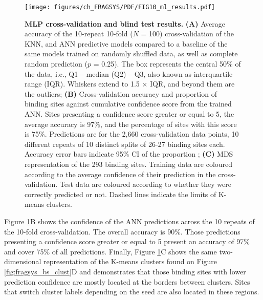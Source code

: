 \begin{figure}[htbp]
    \centering
    \texttt{[image: figures/ch\_FRAGSYS/PDF/FIG10\_ml\_results.pdf]}
    \caption[MLP cross-validation and blind test results]{\textbf{MLP cross-validation and blind test results.} \textbf{(A)} Average accuracy of the 10-repeat 10-fold ($N$ = 100) cross-validation of the KNN, and ANN predictive models compared to a baseline of the same models trained on randomly shuffled data, as well as complete random prediction ($p$ = 0.25). The box represents the central 50\% of the data, i.e., Q1 – median (Q2) – Q3, also known as interquartile range (IQR). Whiskers extend to 1.5 $\times$ IQR, and beyond them are the outliers; \textbf{(B)} Cross-validation accuracy and proportion of binding sites against cumulative confidence score from the trained ANN. Sites presenting a confidence score greater or equal to 5, the average accuracy is 97\%, and the percentage of sites with this score is 75\%. Predictions are for the 2,660 cross-validation data points, 10 different repeats of 10 distinct splits of 26-27 binding sites each. Accuracy error bars indicate 95\% CI of the proportion \cite{WILSON_197_PROP_CI}; \textbf{(C)} MDS representation of the 293 binding sites. Training data are coloured according to the average confidence of their prediction in the cross-validation. Test data are coloured according to whether they were correctly predicted or not. Dashed lines indicate the limits of K-means clusters.}
    \label{fig:MLP_CV_blind_test}
\end{figure}

Figure \ref{fig:MLP_CV_blind_test}B shows the confidence of the ANN predictions across the 10 repeats of the 10-fold cross-validation. The overall accuracy is 90\%. Those predictions presenting a confidence score greater or equal to 5 present an accuracy of 97\% and cover 75\% of all predictions. Finally, Figure \ref{fig:MLP_CV_blind_test}C shows the same two-dimensional representation of the K-means clusters found on Figure \ref{fig:fragsys_bs_clust}D and demonstrates that those binding sites with lower prediction confidence are mostly located at the borders between clusters. Sites that switch cluster labels depending on the seed are also located in these regions.

